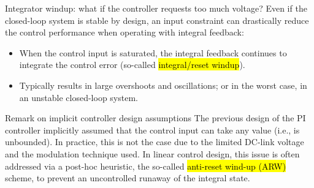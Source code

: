 \begin{frame}{Integrator windup: what if the controller requests too much voltage?}
    Even if the closed-loop system is stable by design, an input constraint can drastically reduce the control performance when operating with integral feedback:\pause%
    \begin{itemize}
        \item When the control input is saturated, the integral feedback continues to integrate the control error (so-called \hl{integral/reset windup}).\pause%
        \item Typically results in large overshoots and oscillations; or in the worst case, in an unstable closed-loop system.
    \end{itemize}\pause%
    \begin{varblock}{Remark on implicit controller design assumptions}
        The previous design of the PI controller implicitly assumed that the control input can take any value (i.e., is unbounded). In practice, this is not the case due to the limited DC-link voltage and the modulation technique used. In linear control design, this issue is often addressed  via a post-hoc heuristic, the so-called \hl{anti-reset wind-up (ARW)} scheme, to prevent an uncontrolled runaway of the integral state.
    \end{varblock}
\end{frame}

